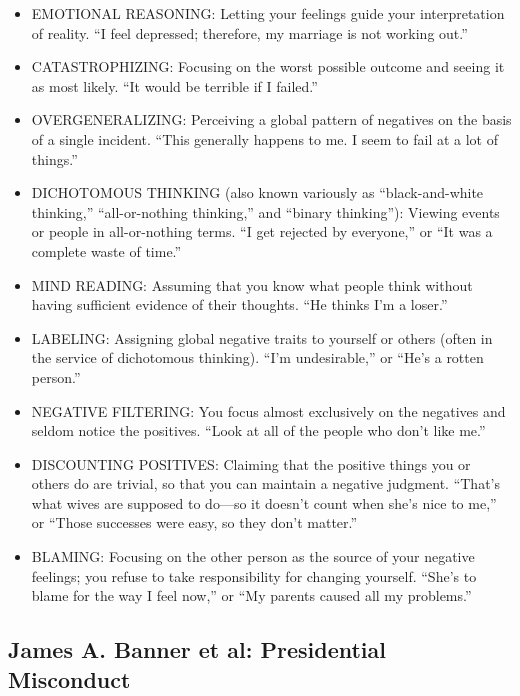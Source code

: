 \documentclass[
]{article}
\begin{document}
\begin{itemize}
\item
  EMOTIONAL REASONING: Letting your feelings guide your interpretation
  of reality. ``I feel depressed; therefore, my marriage is not working
  out.''
\item
  CATASTROPHIZING: Focusing on the worst possible outcome and seeing it
  as most likely. ``It would be terrible if I failed.''
\item
  OVERGENERALIZING: Perceiving a global pattern of negatives on the
  basis of a single incident. ``This generally happens to me. I seem to
  fail at a lot of things.''
\item
  DICHOTOMOUS THINKING (also known variously as ``black-and-white
  thinking,'' ``all-or-nothing thinking,'' and ``binary thinking''):
  Viewing events or people in all-or-nothing terms. ``I get rejected by
  everyone,'' or ``It was a complete waste of time.''
\item
  MIND READING: Assuming that you know what people think without having
  sufficient evidence of their thoughts. ``He thinks I'm a loser.''
\item
  LABELING: Assigning global negative traits to yourself or others
  (often in the service of dichotomous thinking). ``I'm undesirable,''
  or ``He's a rotten person.''
\item
  NEGATIVE FILTERING: You focus almost exclusively on the negatives and
  seldom notice the positives. ``Look at all of the people who don't
  like me.''
\item
  DISCOUNTING POSITIVES: Claiming that the positive things you or others
  do are trivial, so that you can maintain a negative judgment. ``That's
  what wives are supposed to do---so it doesn't count when she's nice to
  me,'' or ``Those successes were easy, so they don't matter.''
\item
  BLAMING: Focusing on the other person as the source of your negative
  feelings; you refuse to take responsibility for changing yourself.
  ``She's to blame for the way I feel now,'' or ``My parents caused all
  my problems.''
\end{itemize}

\hypertarget{james-a.-banner-et-al-presidential-misconduct}{%
\subsection{James A. Banner et al: Presidential
Misconduct}\label{james-a.-banner-et-al-presidential-misconduct}}
\end{document}
